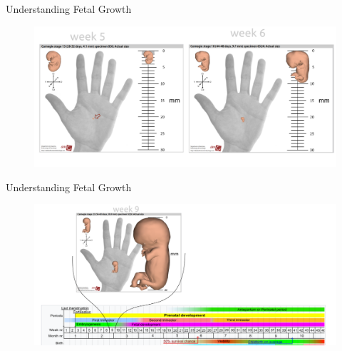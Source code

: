 {
\begin{frame}{Understanding Fetal Growth}
      \begin{figure}
        \centering
        \includegraphics[width=1.0\textwidth]{./figures/fetal-size/versions/drawing-v01.png}
      \end{figure}
\end{frame}
}




{
\begin{frame}{Understanding Fetal Growth}
      \begin{figure}
        \centering
        \includegraphics[width=1.0\textwidth]{./figures/fetal-size/versions/drawing-v02.png}
      \end{figure}
\end{frame}
}
